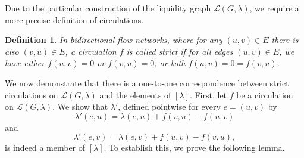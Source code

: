 \documentclass[10pt,twocolumn]{article}
\newtheorem{definition}{Definition}[section]
\newtheorem{lemma}[theorem]{Lemma}
\begin{document}
Due to the particular construction of the liquidity graph \(\mathcal{L}(G,\lambda)\), we require a more precise definition of circulations.

\begin{definition}
  In bidirectional flow networks, where for any \((u,v) \in E\) there is also \((v,u) \in E\), a circulation \(f\) is called strict if for all edges \((u,v) \in E\), we have either \(f(u,v) = 0\) or \(f(v,u) = 0\), or both \(f(u,v) = 0 = f(v,u)\).
\end{definition}

We now demonstrate that there is a one-to-one correspondence between strict circulations on \(\mathcal{L}(G,\lambda)\) and the elements of \([\lambda]\).  
First, let \(f\) be a circulation on \(\mathcal{L}(G,\lambda)\).  
We show that \(\lambda'\), defined pointwise for every \(e = (u,v)\) by
\begin{equation}
  \lambda'(e,u) = \lambda(e,u) + f(v,u) - f(u,v)
\end{equation}
and
\begin{equation}
  \lambda'(e,v) = \lambda(e,v) + f(u,v) - f(v,u),
\end{equation}
is indeed a member of \([\lambda]\).  
To establish this, we prove the following lemma.
\end{document}
